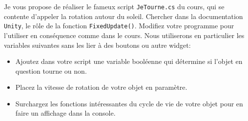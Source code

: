 \documentclass[a4paper,10pt]{article}
\begin{document}
Je vous propose de réaliser le fameux script \lstinline|JeTourne.cs| du cours, qui se contente d'appeler la rotation autour du soleil. Chercher dans la documentation \texttt{Unity}, le rôle de la fonction \lstinline|FixedUpdate()|. Modifiez votre programme pour l'utiliser en conséquence comme dans le cours. Nous utiliserons en particulier les variables suivantes sans les lier à des boutons ou autre widget:
\begin{itemize}
	\item Ajoutez dans votre script une variable booléenne qui détermine si l'objet en question tourne ou non.
	\item Placez la vitesse de rotation de votre objet en paramètre.
	\item Surchargez les fonctions intéressantes du cycle de vie de votre objet pour en faire un affichage dans la console. 
\end{itemize}
\end{document}
